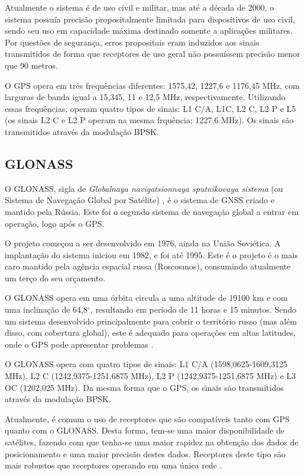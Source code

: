 Atualmente o sistema é de uso civil e militar, mas até a década de 2000, o sistema possuía precisão propositalmente limitada para dispositivos de uso civil, sendo seu uso em capacidade máxima destinado somente a aplicações militares. Por questões de segurança, erros propositais eram induzidos aos sinais transmitidos de forma que receptores de uso geral não possuíssem precisão menor que 90 metros.

O GPS opera em três frequências diferentes: 1575,42, 1227,6 e 1176,45 MHz, com larguras de banda igual a 15,345, 11 e 12,5 MHz, respectivamente. Utilizando essas frequências, operam quatro tipos de sinais: L1 C/A, L1C, L2 C, L2 P e L5 (os sinais L2 C e L2 P operam na mesma frquência: 1227,6 MHz). Os sinais são transmitidos através da modulação BPSK.


\subsection{GLONASS}

O GLONASS, sigla de \textit{Globalnaya navigatsionnaya sputnikovaya sistema} (ou Sistema de Navegação Global por Satélite) \cite{glonass}, é o sistema de GNSS criado e mantido pela Rússia. Este foi o segundo sistema de navegação global a entrar em operação, logo após o GPS.

O projeto começou a ser desenvolvido em 1976, ainda na União Soviética. A implantação do sistema iniciou em 1982, e foi até 1995. Este é o projeto é o mais caro mantido pela agência espacial russa (Roscosmos), consumindo atualmente um terço do seu orçamento.

O GLONASS opera em uma órbita circula a uma altitude de 19100 km e com uma inclinação de 64,8$^{\circ}$, resultando em período de 11 horas e 15 minutos. Sendo um sistema desenvolvido principalmente para cobrir o território russo (mas além disso, com cobertura global), este é adequado para operações em altas latitudes, onde o GPS pode apresentar problemas \cite{polischuk2002}.

O GLONASS opera com quatro tipos de sinais: L1 C/A (1598,0625-1609,3125 MHz), L2 C (1242,9375-1251,6875 MHz), L2 P (1242,9375-1251,6875 MHz) e L3 OC (1202,025 MHz). Da mesma forma que o GPS, os sinais são transmitidos através da modulação BPSK.

Atualmente, é comum o uso de receptores que são compatíveis tanto com GPS quanto com o GLONASS. Desta forma, tem-se uma maior disponibilidade de satélites, fazendo com que tenha-se uma maior rapidez na obtenção dos dados de posicionamento e uma maior precisão destes dados. Receptores deste tipo são mais robustos que receptores operando em uma única rede \cite{angrisano2012}.

